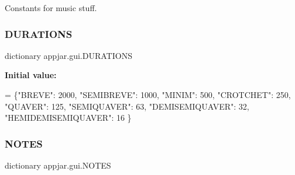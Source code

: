 \begin{DoxyVerb}
Constants for music stuff. 

\mbox{\label{classappjar_1_1gui_a06f257f418c0af92b14905851379f3c8}} 
\subsubsection{\texorpdfstring{D\+U\+R\+A\+T\+I\+O\+NS}{DURATIONS}}
{\footnotesize\ttfamily dictionary appjar.\+gui.\+D\+U\+R\+A\+T\+I\+O\+NS\hspace{0.3cm}{\ttfamily [static]}}

{\bfseries Initial value\+:}
\begin{DoxyCode}
=  \{\textcolor{stringliteral}{"BREVE"}: 2000, \textcolor{stringliteral}{"SEMIBREVE"}: 1000, \textcolor{stringliteral}{"MINIM"}: 500,
                \textcolor{stringliteral}{"CROTCHET"}: 250, \textcolor{stringliteral}{"QUAVER"}: 125, \textcolor{stringliteral}{"SEMIQUAVER"}: 63,
                \textcolor{stringliteral}{"DEMISEMIQUAVER"}: 32, \textcolor{stringliteral}{"HEMIDEMISEMIQUAVER"}: 16
    \}
\end{DoxyCode}
\mbox{\label{classappjar_1_1gui_a7ee91b806425fe99fe528991288e6c8e}} 
\subsubsection{\texorpdfstring{N\+O\+T\+ES}{NOTES}}
{\footnotesize\ttfamily dictionary appjar.\+gui.\+N\+O\+T\+ES\hspace{0.3cm}{\ttfamily [static]}}


\end{DoxyVerb}

